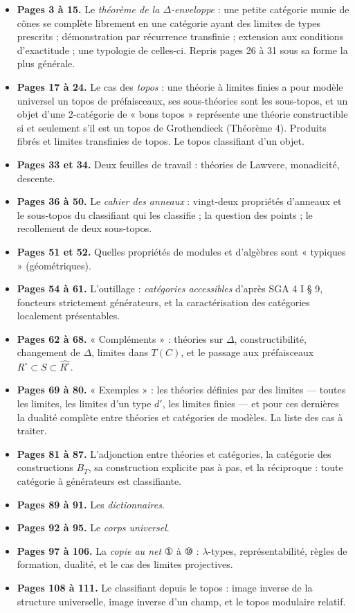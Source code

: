 \documentclass[11pt,a4paper]{article}
\begin{document}
\begin{itemize}
\item \textbf{Pages 3 à 15.} Le \emph{théorème de la $\Delta$-enveloppe} :
une petite catégorie munie de cônes se complète librement en une catégorie
ayant des limites de types prescrits ; démonstration par récurrence
transfinie ; extension aux conditions d'exactitude ; une typologie de
celles-ci. Repris pages 26 à 31 sous sa forme la plus générale.
\item \textbf{Pages 17 à 24.} Le cas des \emph{topos} : une théorie à
limites finies a pour modèle universel un topos de préfaisceaux, ses
sous-théories sont les sous-topos, et un objet d'une 2-catégorie de « bons
topos » représente une théorie constructible si et seulement s'il est un
topos de Grothendieck (Théorème 4). Produits fibrés et limites transfinies
de topos. Le topos classifiant d'un objet.
\item \textbf{Pages 33 et 34.} Deux feuilles de travail : théories de
Lawvere, monadicité, descente.
\item \textbf{Pages 36 à 50.} Le \emph{cahier des anneaux} : vingt-deux
propriétés d'anneaux et le sous-topos du classifiant qui les classifie ;
la question des points ; le recollement de deux sous-topos.
\item \textbf{Pages 51 et 52.} Quelles propriétés de modules et d'algèbres
sont « typiques » (géométriques).
\item \textbf{Pages 54 à 61.} L'outillage : \emph{catégories accessibles}
d'après SGA 4 I § 9, foncteurs strictement générateurs, et la
caractérisation des catégories localement présentables.
\item \textbf{Pages 62 à 68.} « Compléments » : théories sur $\Delta$,
constructibilité, changement de $\Delta$, limites dans $T(C)$, et le
passage aux préfaisceaux $R^{\circ} \subset S \subset \widehat{R^{\circ}}$.
\item \textbf{Pages 69 à 80.} « Exemples » : les théories définies par des
limites — toutes les limites, les limites d'un type $d'$, les limites
finies — et pour ces dernières la dualité complète entre théories et
catégories de modèles. La liste des cas à traiter.
\item \textbf{Pages 81 à 87.} L'adjonction entre théories et catégories,
la catégorie des constructions $B_{T}$, sa construction explicite pas à
pas, et la réciproque : toute catégorie à générateurs est classifiante.
\item \textbf{Pages 89 à 91.} Les \emph{dictionnaires}.
\item \textbf{Pages 92 à 95.} Le \emph{corps universel}.
\item \textbf{Pages 97 à 106.} La \emph{copie au net} ① à ⑩ :
$\lambda$-types, représentabilité, règles de formation, dualité, et le
cas des limites projectives.
\item \textbf{Pages 108 à 111.} Le classifiant depuis le topos : image
inverse de la structure universelle, image inverse d'un champ, et le topos
modulaire relatif.
\end{itemize}
\end{document}
